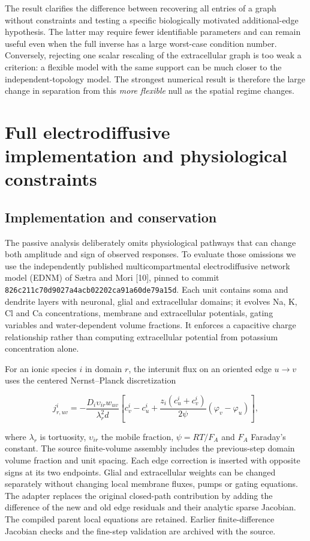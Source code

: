 \documentclass[
  11pt,
]{article}
\begin{document}
The result clarifies the difference between recovering all entries of a
graph without constraints and testing a specific biologically motivated
additional-edge hypothesis. The latter may require fewer identifiable
parameters and can remain useful even when the full inverse has a large
worst-case condition number. Conversely, rejecting one scalar rescaling
of the extracellular graph is too weak a criterion: a flexible model
with the same support can be much closer to the independent-topology
model. The strongest numerical result is therefore the large change in
separation from this \emph{more flexible} null as the spatial regime
changes.

\section{Full electrodiffusive implementation and physiological
constraints}\label{full-electrodiffusive-implementation-and-physiological-constraints}

\subsection{Implementation and
conservation}\label{implementation-and-conservation}

The passive analysis deliberately omits physiological pathways that can
change both amplitude and sign of observed responses. To evaluate those
omissions we use the independently published multicompartmental
electrodiffusive network model (EDNM) of Sætra and Mori {[}10{]}, pinned
to commit \texttt{826c211c70d9027a4acb02202ca91a60de79a15d}. Each unit
contains soma and dendrite layers with neuronal, glial and extracellular
domains; it evolves Na, K, Cl and Ca concentrations, membrane and
extracellular potentials, gating variables and water-dependent volume
fractions. It enforces a capacitive charge relationship rather than
computing extracellular potential from potassium concentration alone.

For an ionic species \(i\) in domain \(r\), the interunit flux on an
oriented edge \(u\to v\) uses the centered Nernst--Planck discretization

\[j_{r,uv}^i=-\frac{D_i\upsilon_{ir}w_{uv}}{\lambda_r^2d}\left[c_v^i-c_u^i+\frac{z_i(c_u^i+c_v^i)}{2\psi}(\varphi_v-\varphi_u)\right],\]

where \(\lambda_r\) is tortuosity, \(\upsilon_{ir}\) the mobile
fraction, \(\psi=RT/F_{\!A}\) and \(F_{\!A}\) Faraday's constant. The
source finite-volume assembly includes the previous-step domain volume
fraction and unit spacing. Each edge correction is inserted with
opposite signs at its two endpoints. Glial and extracellular weights can
be changed separately without changing local membrane fluxes, pumps or
gating equations. The adapter replaces the original closed-path
contribution by adding the difference of the new and old edge residuals
and their analytic sparse Jacobian. The compiled parent local equations
are retained. Earlier finite-difference Jacobian checks and the
fine-step validation are archived with the source.
\end{document}

